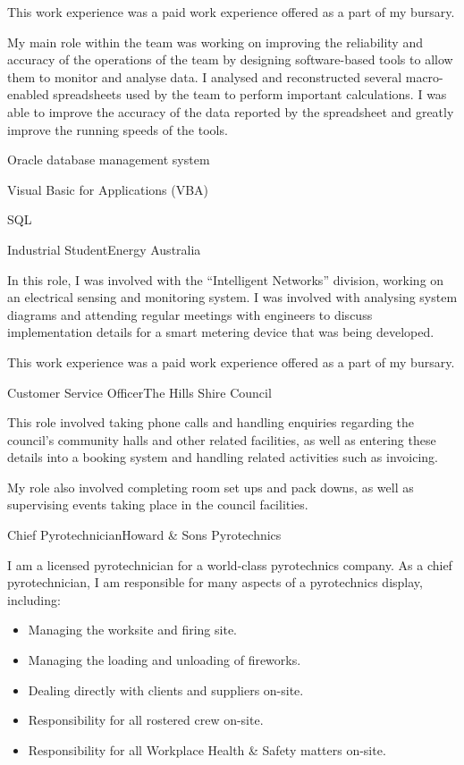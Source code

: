 \documentclass[10pt]{article}
\begin{document}
\begin{professionalExperience}
{This work experience was a paid work experience offered as a part of my 
 bursary.

My main role within the team was working on improving the reliability and 
accuracy of the operations of the team by designing software-based tools to 
allow them to monitor and analyse data. I analysed and reconstructed several 
macro-enabled spreadsheets used by the team to perform important calculations. I
was able to improve the accuracy of the data reported by the spreadsheet and 
greatly improve the running speeds of the tools.}
{\item Oracle database management system
\item Visual Basic for Applications (VBA)
\item SQL}

{Industrial Student}{Energy Australia}
{In this role, I was involved with the ``Intelligent Networks'' division, 
working on an electrical sensing and monitoring system. I was involved with 
analysing system diagrams and attending regular meetings with engineers to 
discuss implementation details for a smart metering device that was being 
developed.

This work experience was a paid work experience offered as a part of my 
 bursary.}
{}

{Customer Service Officer}{The Hills Shire Council}
{This role involved taking phone calls and handling enquiries regarding the 
council's community halls and other related facilities, as well as entering 
these details into a booking system and handling related activities such as 
invoicing.

My role also involved completing room set ups and pack downs, as well as 
supervising events taking place in the council facilities.}
{}

{Chief Pyrotechnician}{Howard \& Sons Pyrotechnics}
{I am a licensed pyrotechnician for a world-class pyrotechnics company. As a 
chief pyrotechnician, I am responsible for many aspects of a pyrotechnics 
display, including:
\begin{itemize}
	\item Managing the worksite and firing site.
	\item Managing the loading and unloading of fireworks.
	\item Dealing directly with clients and suppliers on-site.
	\item Responsibility for all rostered crew on-site.
	\item Responsibility for all Workplace Health \& Safety matters on-site.
\end{itemize}

}
\end{professionalExperience}
\end{document}
